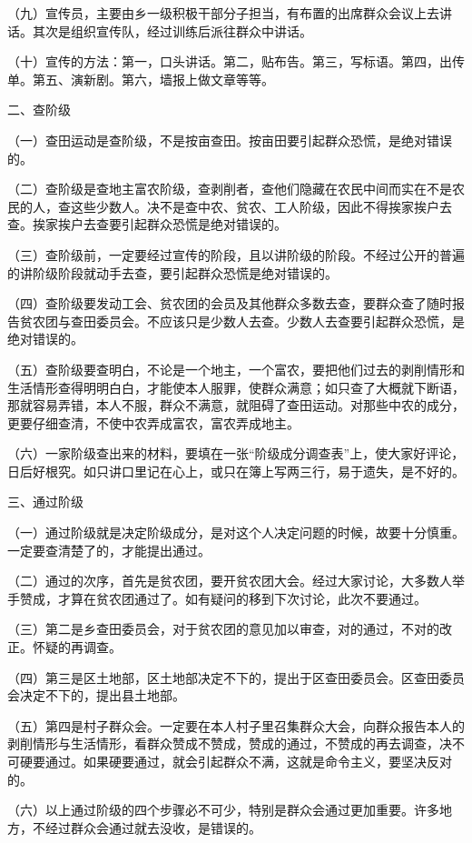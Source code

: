 （九）宣传员，主要由乡一级积极干部分子担当，有布置的出席群众会议上去讲话。其次是组织宣传队，经过训练后派往群众中讲话。

（十）宣传的方法：第一，口头讲话。第二，贴布告。第三，写标语。第四，出传单。第五、演新剧。第六，墙报上做文章等等。

二、查阶级

（一）查田运动是查阶级，不是按亩查田。按亩田要引起群众恐慌，是绝对错误的。

（二）查阶级是查地主富农阶级，查剥削者，查他们隐藏在农民中间而实在不是农民的人，查这些少数人。决不是查中农、贫农、工人阶级，因此不得挨家挨户去查。挨家挨户去查要引起群众恐慌是绝对错误的。

（三）查阶级前，一定要经过宣传的阶段，且以讲阶级的阶段。不经过公开的普遍的讲阶级阶段就动手去查，要引起群众恐慌是绝对错误的。

（四）查阶级要发动工会、贫农团的会员及其他群众多数去查，要群众查了随时报告贫农团与查田委员会。不应该只是少数人去查。少数人去查要引起群众恐慌，是绝对错误的。

（五）查阶级要查明白，不论是一个地主，一个富农，要把他们过去的剥削情形和生活情形查得明明白白，才能使本人服罪，使群众满意；如只查了大概就下断语，那就容易弄错，本人不服，群众不满意，就阻碍了查田运动。对那些中农的成分，更要仔细查清，不使中农弄成富农，富农弄成地主。

（六）一家阶级查出来的材料，要填在一张“阶级成分调查表”上，使大家好评论，日后好根究。如只讲口里记在心上，或只在簿上写两三行，易于遗失，是不好的。

三、通过阶级

（一）通过阶级就是决定阶级成分，是对这个人决定问题的时候，故要十分慎重。一定要查清楚了的，才能提出通过。

（二）通过的次序，首先是贫农团，要开贫农团大会。经过大家讨论，大多数人举手赞成，才算在贫农团通过了。如有疑问的移到下次讨论，此次不要通过。

（三）第二是乡查田委员会，对于贫农团的意见加以审查，对的通过，不对的改正。怀疑的再调查。

（四）第三是区土地部，区土地部决定不下的，提出于区查田委员会。区查田委员会决定不下的，提出县土地部。

（五）第四是村子群众会。一定要在本人村子里召集群众大会，向群众报告本人的剥削情形与生活情形，看群众赞成不赞成，赞成的通过，不赞成的再去调查，决不可硬要通过。如果硬要通过，就会引起群众不满，这就是命令主义，要坚决反对的。

（六）以上通过阶级的四个步骤必不可少，特别是群众会通过更加重要。许多地方，不经过群众会通过就去没收，是错误的。

